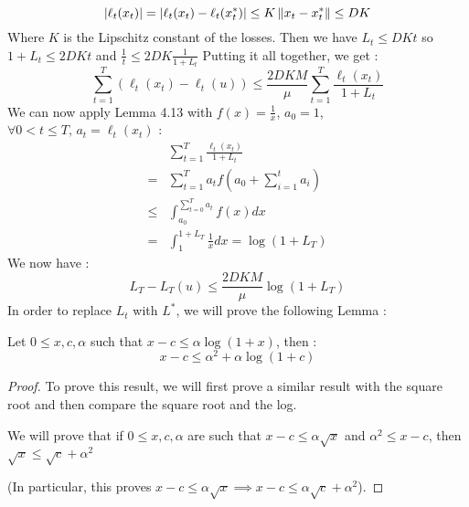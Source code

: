 \begin{solution}[]
\begin{equation*}
	|\ell_t(x_t)| = |\ell_t(x_t) - \ell_t(x_t^{*})| \leq K \left\|x_t - x_t^{*}\right\| \leq DK
\end{equation*}
Where $ K $ is the Lipschitz constant of the losses. Then we have $ L_t \leq DKt $ so $ 1+L_t \leq  2DKt $ and $ \frac{1}{t} \leq 2DK \frac{1}{1 + L_t} $
Putting it all together, we get :
\begin{equation*}
	\sum_{t=1}^{T}(\ell_t(x_t)-\ell_t(u)) \leq\frac{2DKM}{\mu} \sum_{t=1}^{T} \frac{\ell_t(x_t)}{1+L_t}
\end{equation*}
We can now apply Lemma 4.13 with $ f(x) = \frac{1}{x} $, $ a_0 =1 $, $ \forall 0<t\leq T, \, a_t = \ell_t(x_t) $ :
\begin{align*}
	&\sum_{t=1}^{T}\frac{\ell_t(x_t)}{1+L_t} \\
	=& \sum_{t=1}^{T}a_t f \left( a_0+\sum_{i=1}^{t}a_i \right)\\
	\leq& \int_{a_0}^{\sum_{t=0}^{T}a_t} f(x)dx\\
	=& \int_{1}^{1+L_T} \frac{1}{x} dx = \log(1+L_T)
\end{align*}
We now have :
\begin{equation*}
	L_T - L_T(u) \leq \frac{2DKM}{\mu}\log(1+L_T) 
\end{equation*}
In order to replace $ L_t $ with $ L^{*} $, we will prove the following Lemma :
\begin{lemma*}
	Let $ 0 \leq x,c, \alpha $ such that $ x-c \leq \alpha\log(1+x) $, then :
\begin{equation*}
	x-c \leq \alpha^2 + \alpha\log(1+c) 
\end{equation*}
\end{lemma*}
\begin{proof}
	To prove this result, we will first prove a similar result with the square root and then compare the square root and the log.

	We will prove that if $ 0\leq x,c,\alpha $ are such that $ x-c \leq \alpha \sqrt{x} $ and $ \alpha^2 \leq x-c $, then $ \sqrt{x} \leq \sqrt{c} + \alpha^{2} $

	(In particular, this proves $x-c \leq \alpha\sqrt{x} \implies x-c \leq \alpha\sqrt{c} + \alpha^2 $).


\end{proof}
\end{solution}
